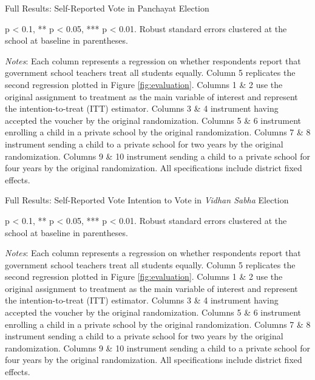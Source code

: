 \documentclass[hidelinks, 12pt, titlepage]{article}
\begin{document}
\begin{landscape}
				\begin{table}
					\begin{threeparttable}
						\centering
						\caption{Full Results: Self-Reported Vote in Panchayat Election\label{table:appendixpanchayat}}
						
						\begin{tablenotes}
							\item * p < 0.1, ** p < 0.05, *** p < 0.01. Robust standard errors clustered at the school at baseline in parentheses.
							\item \emph{Notes}: Each column represents a regression on whether respondents report that government school teachers treat all students equally.  Column 5 replicates the second regression plotted in Figure \ref{fig:evaluation}.  Columns 1 \& 2 use the original assignment to treatment as the main variable of interest and represent the intention-to-treat (ITT) estimator.  Columns 3 \& 4 instrument having accepted the voucher by the original randomization.  Columns 5 \& 6 instrument enrolling a child in a private school by the original randomization.  Columns 7 \& 8 instrument sending a child to a private school for two years by the original randomization.  Columns 9 \& 10 instrument sending a child to a private school for four years by the original randomization.  All specifications include district fixed effects.
						\end{tablenotes}
					\end{threeparttable}
				\end{table}

				\clearpage

				\begin{table}
					\begin{threeparttable}
						\centering
						\caption{Full Results: Self-Reported Vote Intention to Vote in \emph{Vidhan Sabha} Election\label{table:appendixvs}}
						
						\begin{tablenotes}
							\item * p < 0.1, ** p < 0.05, *** p < 0.01. Robust standard errors clustered at the school at baseline in parentheses.
							\item \emph{Notes}: Each column represents a regression on whether respondents report that government school teachers treat all students equally.  Column 5 replicates the second regression plotted in Figure \ref{fig:evaluation}.  Columns 1 \& 2 use the original assignment to treatment as the main variable of interest and represent the intention-to-treat (ITT) estimator.  Columns 3 \& 4 instrument having accepted the voucher by the original randomization.  Columns 5 \& 6 instrument enrolling a child in a private school by the original randomization.  Columns 7 \& 8 instrument sending a child to a private school for two years by the original randomization.  Columns 9 \& 10 instrument sending a child to a private school for four years by the original randomization.  All specifications include district fixed effects.
						\end{tablenotes}
					\end{threeparttable}
				\end{table}


\end{landscape}
\end{document}
